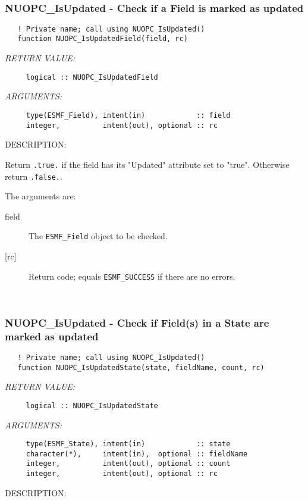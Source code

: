  
\mbox{}\hrulefill\ 
 
\subsubsection [NUOPC\_IsUpdated] {NUOPC\_IsUpdated - Check if a Field is marked as updated}


\begin{verbatim}   ! Private name; call using NUOPC_IsUpdated()
   function NUOPC_IsUpdatedField(field, rc)\end{verbatim}{\em RETURN VALUE:}
\begin{verbatim}     logical :: NUOPC_IsUpdatedField\end{verbatim}{\em ARGUMENTS:}
\begin{verbatim}     type(ESMF_Field), intent(in)            :: field
     integer,          intent(out), optional :: rc\end{verbatim}
{\sf DESCRIPTION:\\ }


     Return {\tt .true.} if the field has its "Updated"
     attribute set to "true". Otherwise return {\tt .false.}. 
  
     The arguments are:
     \begin{description}
     \item[field]
       The {\tt ESMF\_Field} object to be checked.
     \item[{[rc]}]
       Return code; equals {\tt ESMF\_SUCCESS} if there are no errors.
     \end{description}
   
 
\mbox{}\hrulefill\ 
 
\subsubsection [NUOPC\_IsUpdated] {NUOPC\_IsUpdated - Check if Field(s) in a State are marked as updated}


\begin{verbatim}   ! Private name; call using NUOPC_IsUpdated()
   function NUOPC_IsUpdatedState(state, fieldName, count, rc)\end{verbatim}{\em RETURN VALUE:}
\begin{verbatim}     logical :: NUOPC_IsUpdatedState\end{verbatim}{\em ARGUMENTS:}
\begin{verbatim}     type(ESMF_State), intent(in)            :: state
     character(*),     intent(in),  optional :: fieldName
     integer,          intent(out), optional :: count
     integer,          intent(out), optional :: rc\end{verbatim}
{\sf DESCRIPTION:\\ }



